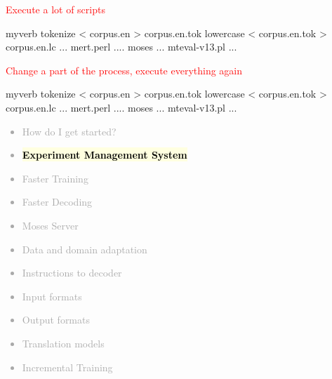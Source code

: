 \documentclass[landscape]{uedslides2C}
\newcommand{\currenttopic}[1]{\colorbox{lightyellow}{\textcolor{black}{\bf #1}}}
\begin{document}
{\small

\begin{center}
\textcolor{red}{Execute a lot of scripts} \\
\begin{SaveVerbatim}{myverb}
tokenize < corpus.en > corpus.en.tok
lowercase < corpus.en.tok > corpus.en.lc
...
mert.perl ....
moses ...
mteval-v13.pl ...
\end{SaveVerbatim}
\colorbox{gray}{}

\vspace{10mm}
\textcolor{red}{Change a part of the process, execute everything again} \\
\begin{SaveVerbatim}{myverb}
tokenize < corpus.en > corpus.en.tok
lowercase < corpus.en.tok > corpus.en.lc
...
mert.perl ....
moses ...
mteval-v13.pl ...
\end{SaveVerbatim}
\colorbox{gray}{}
\end{center}
}


% 
% 
% 



\vspace{-5mm}
\textcolor{darkgrey}{
\small
\begin{itemize} \itemsep -1mm
\item {How do I get started?}
\item \currenttopic{Experiment Management System}
\item {Faster Training}
\item {Faster Decoding}
\item {Moses Server}
\item {Data and domain adaptation}
\item {Instructions to decoder}
\item {Input formats}
\item {Output formats}
\item {Translation models}
\item {Incremental Training}
\end{itemize}
}
\end{document}
